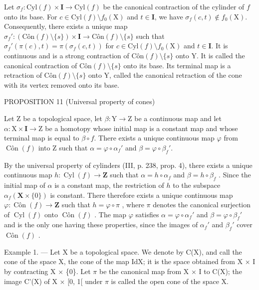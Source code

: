 Let \(\sigma_f\colon \mathrm{Cyl}(f)\times \mathbf{I}\to \mathrm{Cyl}(f)\) be the canonical contraction of the cylinder of \(f\) onto its base. For \(c\in \mathrm{Cyl}(f)\setminus f_0(\mathrm{X})\) and \(t\in \mathbf{I}\), we have \(\sigma_f(c,t)\notin f_0(\mathrm{X})\). Consequently, there exists a unique map \(\sigma_f'\colon (\mathrm{Côn}(f)\setminus\{s\})\times \mathbf{I}\to \mathrm{Côn}(f)\setminus\{s\}\) such that \(\sigma_f'(\pi(c),t)=\pi(\sigma_f(c,t))\) for \(c\in \mathrm{Cyl}(f)\setminus f_0(\mathrm{X})\) and \(t\in \mathbf{I}\). It is continuous and is a strong contraction of \(\mathrm{Côn}(f)\setminus\{s\}\) onto Y. It is called the canonical contraction of \(\mathrm{Côn}(f)\setminus\{s\}\) onto its base. Its terminal map is a retraction of \(\mathrm{Côn}(f)\setminus\{s\}\) onto Y, called the canonical retraction of the cone with its vertex removed onto its base.

PROPOSITION 11 (Universal property of cones)

Let Z be a topological space, let \(\beta: \mathrm{Y} \to \mathrm{Z}\) be a continuous map and let \(\alpha: \mathrm{X} \times \mathbf{I} \to \mathrm{Z}\) be a homotopy whose initial map is a constant map and whose terminal map is equal to \(\beta \circ f\). There exists a unique continuous map \(\varphi\) from \(\operatorname{Côn}(f)\) into Z such that \(\alpha = \varphi \circ \alpha_f'\) and \(\beta = \varphi \circ \beta_f'\).

By the universal property of cylinders (III, p. 238, prop. 4), there exists a unique continuous map \(h \colon \operatorname{Cyl}(f) \to \mathbf{Z}\) such that \(\alpha = h \circ \alpha_f\) and \(\beta = h \circ \beta_f\) . Since the initial map of \(\alpha\) is a constant map, the restriction of \(h\) to the subspace \(\alpha_f(\mathbf{X} \times \{0\})\) is constant. There therefore exists a unique continuous map \(\varphi \colon \operatorname{Côn}(f) \to \mathbf{Z}\) such that \(h = \varphi \circ \pi\) , where \(\pi\) denotes the canonical surjection of \(\operatorname{Cyl}(f)\) onto \(\operatorname{Côn}(f)\) . The map \(\varphi\) satisfies \(\alpha = \varphi \circ \alpha_f'\) and \(\beta = \varphi \circ \beta_f'\) and is the only one having these properties, since the images of \(\alpha_f'\) and \(\beta_f'\) cover \(\operatorname{Côn}(f)\) .

Example 1. --- Let X be a topological space. We denote by C(X), and call the cone of the space X, the cone of the map IdX; it is the space obtained from X × I by contracting X × \{0\}. Let \(\pi\) be the canonical map from X × I to C(X); the image C'(X) of X × {[}0, 1{[} under \(\pi\) is called the open cone of the space X.

